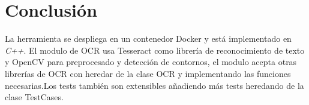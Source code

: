 \section{Conclusión}
La herramienta se despliega en un contenedor Docker y está implementado en \emph{C++}. El modulo de OCR usa Tesseract como librería de reconocimiento de texto y OpenCV para preprocesado y detección de contornos, el modulo acepta otras librerías de OCR con heredar de la clase OCR y implementando las funciones necesarias.Los tests también son extensibles añadiendo más tests heredando de la clase TestCases.

